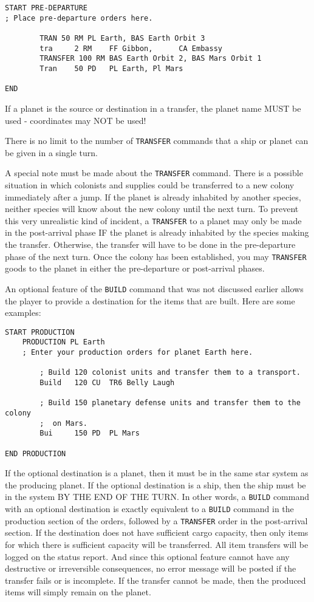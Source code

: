 \documentclass[10pt,titlepage]{article}
\begin{document}
\begin{verbatim}
START PRE-DEPARTURE
; Place pre-departure orders here.

        TRAN 50 RM PL Earth, BAS Earth Orbit 3
        tra     2 RM    FF Gibbon,      CA Embassy
        TRANSFER 100 RM BAS Earth Orbit 2, BAS Mars Orbit 1
        Tran    50 PD   PL Earth, Pl Mars

END
\end{verbatim} 

If a planet is the source or destination in a transfer, the planet name MUST
be used - coordinates may NOT be used!

There is no limit to the number of \texttt{TRANSFER} commands that a ship or planet can
be given in a single turn.

A special note must be made about the \texttt{TRANSFER} command.  There is a possible
situation in which colonists and supplies could be transferred to a new colony
immediately after a jump.  If the planet is already inhabited by another
species, neither species will know about the new colony until the next turn.
To prevent this very unrealistic kind of incident, a \texttt{TRANSFER} to a planet may
only be made in the post-arrival phase IF the planet is already inhabited by
the species making the transfer.  Otherwise, the transfer will have to be
done in the pre-departure phase of the next turn.  Once the colony has been
established, you may \texttt{TRANSFER} goods to the planet in either the pre-departure
or post-arrival phases.

An optional feature of the \texttt{BUILD} command that was not discussed earlier allows
the player to provide a destination for the items that are built.  Here are
some examples:

\begin{verbatim}
START PRODUCTION
    PRODUCTION PL Earth
    ; Enter your production orders for planet Earth here.

        ; Build 120 colonist units and transfer them to a transport.
        Build   120 CU  TR6 Belly Laugh

        ; Build 150 planetary defense units and transfer them to the colony
        ;  on Mars.
        Bui     150 PD  PL Mars

END PRODUCTION
\end{verbatim} 

If the optional destination is a planet, then it must be in the same star
system as the producing planet.  If the optional destination is a ship, then
the ship must be in the system BY THE END OF THE TURN.  In other words, a \texttt{BUILD}
command with an optional destination is exactly equivalent to a \texttt{BUILD} command
in the production section of the orders, followed by a \texttt{TRANSFER} order in the
post-arrival section.  If the destination does not have sufficient cargo
capacity, then only items for which there is sufficient capacity will be
transferred.  All item transfers will be logged on the status report.  And
since this optional feature cannot have any destructive or irreversible
consequences, no error message will be posted if the transfer fails or is
incomplete.  If the transfer cannot be made, then the produced items will
simply remain on the planet.
\end{document}
